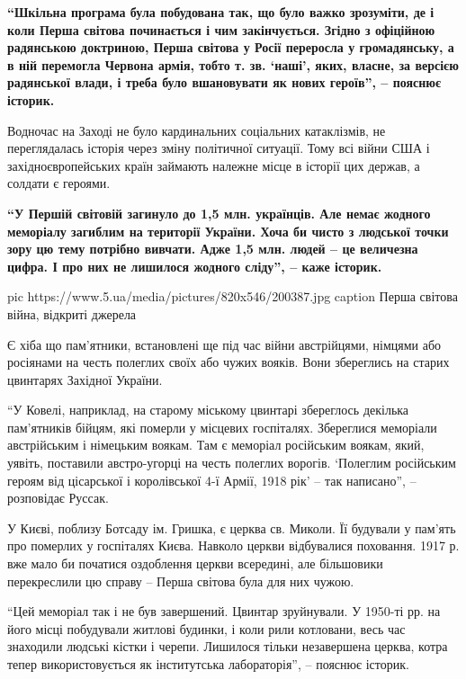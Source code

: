 \begin{leftbar}
	\bfseries
\enquote{Шкільна програма була побудована так, що було важко зрозуміти, де і коли Перша
світова починається і чим закінчується. Згідно з офіційною радянською
доктриною, Перша світова у Росії переросла у громадянську, а в ній перемогла
Червона армія, тобто т. зв. \enquote{наші}, яких, власне, за версією радянської влади,
і треба було вшановувати як нових героїв}, – пояснює історик. 
\end{leftbar}

Водночас на Заході не було кардинальних соціальних катаклізмів, не
переглядалась історія через зміну політичної ситуації. Тому всі війни США і
західноєвропейських країн займають належне місце в історії цих держав, а
солдати є героями.

\begin{leftbar}
	\bfseries
\enquote{У Першій світовій загинуло до 1,5 млн. українців. Але немає жодного
меморіалу загиблим на території України. Хоча би чисто з людської точки
зору цю тему потрібно вивчати. Адже 1,5 млн. людей – це величезна цифра. І
про них не лишилося жодного сліду}, – каже історик. 
\end{leftbar}

\ifcmt
pic https://www.5.ua/media/pictures/820x546/200387.jpg
caption Перша світова війна, відкриті джерела
\fi

Є хіба що пам'ятники, встановлені ще під час війни австрійцями, німцями
або росіянами на честь полеглих своїх або чужих вояків. Вони збереглись на
старих цвинтарях Західної України.

\enquote{У Ковелі, наприклад, на старому міському цвинтарі збереглось декілька
пам'ятників бійцям, які померли у місцевих госпіталях. Збереглися
меморіали австрійським і німецьким воякам. Там є меморіал російським
воякам, який, уявіть, поставили австро-угорці на честь полеглих ворогів.
\enquote{Полеглим російським героям від цісарської і королівської 4-ї Армії, 1918
рік} – так написано}, – розповідає Руссак.

У Києві, поблизу Ботсаду ім. Гришка, є церква св. Миколи. Її будували у
пам'ять про померлих у госпіталях Києва. Навколо церкви відбувалися
поховання. 1917 р. вже мало би початися оздоблення церкви всередині, але
більшовики перекреслили цю справу – Перша світова була для них чужою.

\enquote{Цей меморіал так і не був завершений. Цвинтар зруйнували. У 1950-ті рр.
на його місці побудували житлові будинки, і коли рили котловани, весь час
знаходили людські кістки і черепи. Лишилося тільки незавершена церква,
котра тепер використовується як інститутська лабораторія}, – пояснює
історик.

